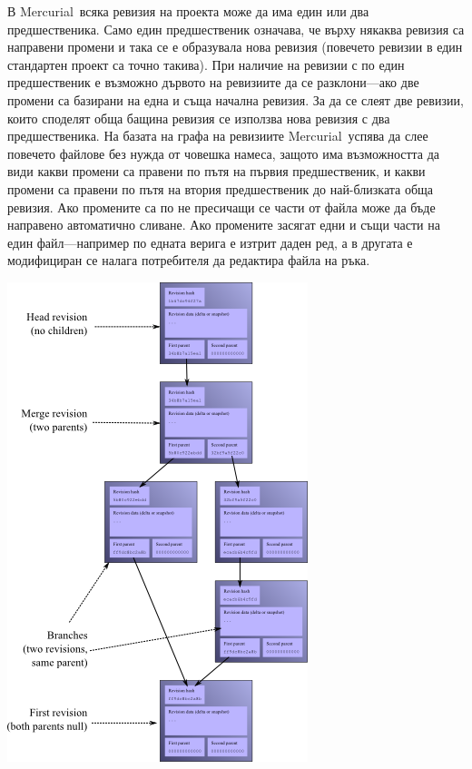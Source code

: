 \documentclass[a4paper]{article}
\def\Hg{Mercurial}
\begin{document}
    В \Hg\ всяка ревизия на проекта може да има един или два предшественика.
    Само един предшественик означава, че върху някаква ревизия са направени
    промени и така се е образувала нова ревизия (повечето ревизии в един
    стандартен проект са точно такива). При наличие на ревизии с по един
    предшественик е възможно дървото на ревизиите да се разклони---ако две
    промени са базирани на една и съща начална ревизия. За да се слеят две
    ревизии, които споделят обща бащина ревизия се използва нова ревизия с два
    предшественика. На базата на графа на ревизиите \Hg\ успява да слее повечето
    файлове без нужда от човешка намеса, защото има възможността да види какви
    промени са правени по пътя на първия предшественик, и какви промени са
    правени по пътя на втория предшественик до най-близката обща ревизия. Ако
    промените са по не пресичащи се части от файла може да бъде направено
    автоматично сливане. Ако промените засягат едни и същи части на един
    файл---например по едната верига е изтрит даден ред, а в другата
    е модифициран се налага потребителя да редактира файла на ръка.

    \includegraphics[scale=0.5]{hg_revisions}
\end{document}
